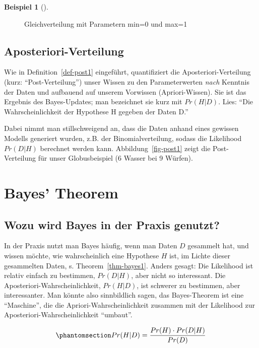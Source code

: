 \documentclass[
  ngerman,
  letterpaper,
  twoside,
  open=any]{scrbook}
\theoremstyle{definition}
\newtheorem{example}{Beispiel}[chapter]
\theoremstyle{plain}
\theoremstyle{definition}
\theoremstyle{definition}
\theoremstyle{remark}
\begin{document}
\begin{example}[]
\begin{figure}[H]
\caption{\label{fig-unif01}Gleichverteilung mit Parametern min=0 und
max=1}

\end{figure}%

\subsection{Aposteriori-Verteilung}\label{aposteriori-verteilung-1}

Wie in Definition~\ref{def-post1} eingeführt, quantifiziert die
Aposteriori-Verteilung (kurz: \enquote{Post-Verteilung}) unser Wissen zu
den Parameterwerten \emph{nach} Kenntnis der Daten und aufbauend auf
unserem Vorwissen (Apriori-Wissen). Sie ist das Ergebnis des
Bayes-Updates; man bezeichnet sie kurz mit \(Pr(H|D)\). Lies:
\enquote{Die Wahrscheinlichkeit der Hypothese H gegeben der Daten D.}

Dabei nimmt man stillschweigend an, dass die Daten anhand eines gewissen
Modells generiert wurden, z.B. der Binomialverteilung, sodass die
Likelihood \(Pr(D|H)\) berechnet werden kann. Abbildung~\ref{fig-post1}
zeigt die Post-Verteilung für unser Globusbeispiel (6 Wasser bei 9
Würfen).

\section{Bayes' Theorem}\label{bayes-theorem}

\subsection{Wozu wird Bayes in der Praxis
genutzt?}\label{wozu-wird-bayes-in-der-praxis-genutzt}

In der Praxis nutzt man Bayes häufig, wenn man Daten \(D\) gesammelt
hat, und wissen möchte, wie wahrscheinlich eine Hypothese \(H\) ist, im
Lichte dieser gesammelten Daten, s. Theorem~\ref{thm-bayes1}. Anders
gesagt: Die Likelihood ist relativ einfach zu bestimmen, \(Pr(D|H)\),
aber nicht so interessant. Die Aposteriori-Wahrscheinlichkeit,
\(Pr(H|D)\), ist schwerer zu bestimmen, aber interessanter. Man könnte
also sinnbildlich sagen, das Bayes-Theorem ist eine \enquote{Maschine},
die die Apriori-Wahrscheinlichkeit zusammen mit der Likelihood zur
Aposteriori-Wahrscheinlichkeit \enquote{umbaut}.

\begin{equation}\protect\phantomsection\label{eq-bayes3}{Pr(H|D) = \frac{ Pr(H) \cdot Pr(D|H) }{Pr(D)}}\end{equation}


\end{example}
\end{document}
